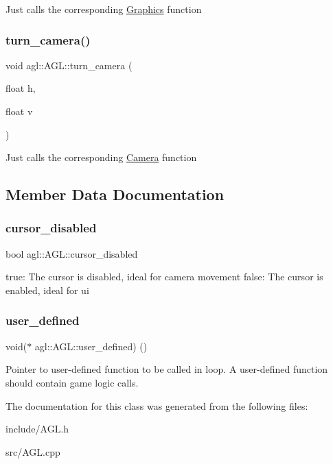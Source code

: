 Just calls the corresponding \mbox{\hyperlink{classagl_1_1Graphics}{Graphics}} function \mbox{\label{classagl_1_1AGL_a864defc42cebdd263cef17adeb313a97}} 
\subsubsection{\texorpdfstring{turn\_camera()}{turn\_camera()}}
{\footnotesize\ttfamily void agl\+::\+A\+G\+L\+::turn\+\_\+camera (\begin{DoxyParamCaption}\item[{float}]{h,  }\item[{float}]{v }\end{DoxyParamCaption})}

Just calls the corresponding \mbox{\hyperlink{classagl_1_1Camera}{Camera}} function 

\subsection{Member Data Documentation}
\mbox{\label{classagl_1_1AGL_ad6593dbf0231be0fb3b5bdce34091e35}} 
\subsubsection{\texorpdfstring{cursor\_disabled}{cursor\_disabled}}
{\footnotesize\ttfamily bool agl\+::\+A\+G\+L\+::cursor\+\_\+disabled\hspace{0.3cm}{\ttfamily [private]}}

true\+: The cursor is disabled, ideal for camera movement false\+: The cursor is enabled, ideal for ui \mbox{\label{classagl_1_1AGL_a99b802fbea79f60b87339212b7907633}} 
\subsubsection{\texorpdfstring{user\_defined}{user\_defined}}
{\footnotesize\ttfamily void($\ast$ agl\+::\+A\+G\+L\+::user\+\_\+defined) ()\hspace{0.3cm}{\ttfamily [private]}}

Pointer to user-\/defined function to be called in loop. A user-\/defined function should contain game logic calls. 

The documentation for this class was generated from the following files\+:\begin{DoxyCompactItemize}
\item 
include/A\+G\+L.\+h\item 
src/A\+G\+L.\+cpp\end{DoxyCompactItemize}
